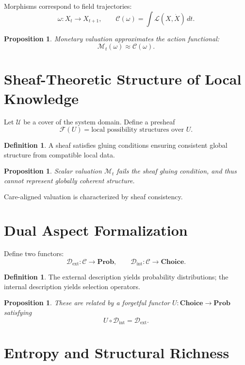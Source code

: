 \documentclass[11pt,a4paper]{article}
\newtheorem{proposition}[theorem]{Proposition}
\theoremstyle{definition}
\newtheorem{definition}[theorem]{Definition}
\theoremstyle{remark}
\begin{document}
Morphisms correspond to field trajectories:
\[
\omega : X_t \to X_{t+1}, \qquad \mathcal{C}(\omega) = \int \mathcal{L}(X, \dot{X})\, dt.
\]

\begin{proposition}
Monetary valuation approximates the action functional:
\[
\mathcal{M}_t(\omega) \approx \mathcal{C}(\omega).
\]
\end{proposition}

\section{Sheaf-Theoretic Structure of Local Knowledge}

Let $\mathcal{U}$ be a cover of the system domain. Define a presheaf
\[
\mathcal{F}(U) = \text{local possibility structures over } U.
\]

\begin{definition}
A sheaf satisfies gluing conditions ensuring consistent global structure from compatible local data.
\end{definition}

\begin{proposition}
Scalar valuation $\mathcal{M}_t$ fails the sheaf gluing condition, and thus cannot represent globally coherent structure.
\end{proposition}

Care-aligned valuation is characterized by sheaf consistency.

\section{Dual Aspect Formalization}

Define two functors:
\[
\mathcal{D}_{\mathrm{ext}} : \mathcal{C} \to \mathbf{Prob}, \qquad \mathcal{D}_{\mathrm{int}} : \mathcal{C} \to \mathbf{Choice}.
\]

\begin{definition}
The external description yields probability distributions; the internal description yields selection operators.
\end{definition}

\begin{proposition}
These are related by a forgetful functor $U : \mathbf{Choice} \to \mathbf{Prob}$ satisfying
\[
U \circ \mathcal{D}_{\mathrm{int}} = \mathcal{D}_{\mathrm{ext}}.
\]
\end{proposition}

\section{Entropy and Structural Richness}
\end{document}
